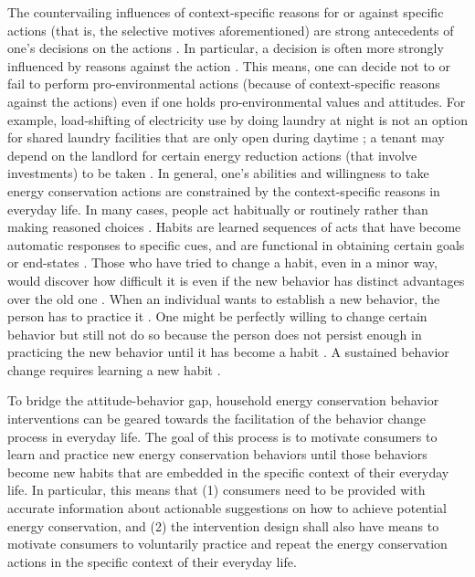 The countervailing influences of context-specific reasons for or against specific actions (that is, the selective motives aforementioned) are strong antecedents of one's decisions on the actions  \citep{Claudy2013}. In particular, a decision is often more strongly influenced by reasons against the action  \citep{Claudy2013,Berthou2013}. This means, one can decide not to or fail to perform pro-environmental actions (because of context-specific reasons against the actions) even if one holds pro-environmental values and attitudes. For example, load-shifting of electricity use by doing laundry at night is not an option for shared laundry facilities that are only open during daytime  \citep{Entwistle2015}; a tenant may depend on the landlord for certain energy reduction actions (that involve investments) to be taken  \citep{Dillahunt2010}. In general, one's abilities and willingness to take energy conservation actions are constrained by the context-specific reasons in everyday life. 
In many cases, people act habitually or routinely rather than making reasoned choices  \citep{Steg2009,Berthou2013}. Habits are learned sequences of acts that have become automatic responses to specific cues, and are functional in obtaining certain goals or end-states  \citep{Verplanken1999}. Those who have tried to change a habit, even in a minor way, would discover how difficult it is even if the new behavior has distinct advantages over the old one  \citep{Kollmuss2002}. When an individual wants to establish a new behavior, the person has to practice it  \citep{Kollmuss2002}. One might be perfectly willing to change certain behavior but still not do so because the person does not persist enough in practicing the new behavior until it has become a habit  \citep{Kollmuss2002}. A sustained behavior change requires learning a new habit  \citep{Dillahunt:2009:GEU:1620545.1620583}. 

To bridge the attitude-behavior gap, household energy conservation behavior interventions can be geared towards the facilitation of the behavior change process in everyday life. The goal of this process is to motivate consumers to learn and practice new energy conservation behaviors until those behaviors become new habits that are embedded in the specific context of their everyday life. In particular, this means that (1) consumers need to be provided with accurate information about actionable suggestions on how to achieve potential energy conservation, and (2) the intervention design shall also have means to motivate consumers to voluntarily practice and repeat the energy conservation actions in the specific context of their everyday life.  

